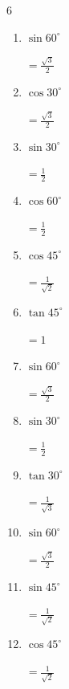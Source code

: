 \begin{multicols}{6}
\begin{enumerate}
        $\displaystyle =\frac{1}{2}$

  \item $\displaystyle \sin{60^\circ}$

        $\displaystyle =\frac{\sqrt{3}}{2}$

  \item $\displaystyle \cos{30^\circ}$

        $\displaystyle =\frac{\sqrt{3}}{2}$

  \item $\displaystyle \sin{30^\circ}$

        $\displaystyle =\frac{1}{2}$

  \item $\displaystyle \cos{60^\circ}$

        $\displaystyle =\frac{1}{2}$

  \item $\displaystyle \cos{45^\circ}$

        $\displaystyle =\frac{1}{\sqrt{2}}$

  \item $\displaystyle \tan{45^\circ}$

        $\displaystyle =1$

  \item $\displaystyle \sin{60^\circ}$

        $\displaystyle =\frac{\sqrt{3}}{2}$

  \item $\displaystyle \sin{30^\circ}$

        $\displaystyle =\frac{1}{2}$

  \item $\displaystyle \tan{30^\circ}$

        $\displaystyle =\frac{1}{\sqrt{3}}$

  \item $\displaystyle \sin{60^\circ}$

        $\displaystyle =\frac{\sqrt{3}}{2}$

\columnbreak %

\resetques

  \item $\displaystyle \sin{45^\circ}$

        $\displaystyle =\frac{1}{\sqrt{2}}$

  \item $\displaystyle \cos{45^\circ}$

        $\displaystyle =\frac{1}{\sqrt{2}}$


\end{enumerate}
\end{multicols}
